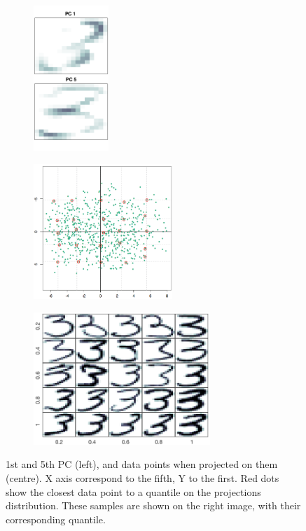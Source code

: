 \documentclass[a4paper, 10pt]{article}
\begin{document}
  \begin{figure}[h]
    \centering
    \hfill
    \begin{subfigure}[t]{0.15\linewidth}
      \includegraphics[width=\linewidth, height=5.5cm]{./lab3/PCA/PC_interpret/PC1+PC5.png}
    \end{subfigure}
    \hfill
    \begin{subfigure}[t]{5.4cm}
      \includegraphics[width=\linewidth, height= 5.1cm]{./lab3/PCA/PC_interpret/quantiles.png}
    \end{subfigure}
    \hfill
    \begin{subfigure}[t]{5.4cm}
      \includegraphics[width=\linewidth, height = 5.0cm]{./lab3/PCA/PC_interpret/Y1_X5.png}
    \end{subfigure}
    \hfill \mbox{}
    \caption{1st and 5th PC (left), and data points when projected on them 
    (centre). X axis correspond to the fifth, Y to the first. Red dots 
    show the closest data point to a quantile on the projections distribution.
    These samples are shown on the right image, with their corresponding quantile.}
    \label{fig:l3_pc_interpret}
  \end{figure}
  
\end{document}
